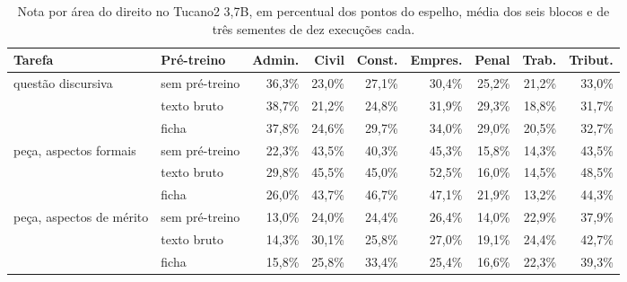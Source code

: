 \documentclass{IOS-Book-Article}
\begin{document}
\begin{table}[!ht]
\centering
\caption{Nota por área do direito no Tucano2 3,7B, em percentual dos pontos do espelho, média dos seis blocos e de três sementes de dez execuções cada.}
\footnotesize\setlength{\tabcolsep}{3pt}
\begin{tabular}{llrrrrrrr}
\hline
\textbf{Tarefa} & \textbf{Pré-treino} & \textbf{Admin.} & \textbf{Civil} & \textbf{Const.} & \textbf{Empres.} & \textbf{Penal} & \textbf{Trab.} & \textbf{Tribut.} \\
\hline
\multirow{3}{*}{questão discursiva} & sem pré-treino & 36,3\% & 23,0\% & 27,1\% & 30,4\% & 25,2\% & 21,2\% & 33,0\% \\
 & texto bruto & 38,7\% & 21,2\% & 24,8\% & 31,9\% & 29,3\% & 18,8\% & 31,7\% \\
 & ficha & 37,8\% & 24,6\% & 29,7\% & 34,0\% & 29,0\% & 20,5\% & 32,7\% \\
\multirow{3}{*}{peça, aspectos formais} & sem pré-treino & 22,3\% & 43,5\% & 40,3\% & 45,3\% & 15,8\% & 14,3\% & 43,5\% \\
 & texto bruto & 29,8\% & 45,5\% & 45,0\% & 52,5\% & 16,0\% & 14,5\% & 48,5\% \\
 & ficha & 26,0\% & 43,7\% & 46,7\% & 47,1\% & 21,9\% & 13,2\% & 44,3\% \\
\multirow{3}{*}{peça, aspectos de mérito} & sem pré-treino & 13,0\% & 24,0\% & 24,4\% & 26,4\% & 14,0\% & 22,9\% & 37,9\% \\
 & texto bruto & 14,3\% & 30,1\% & 25,8\% & 27,0\% & 19,1\% & 24,4\% & 42,7\% \\
 & ficha & 15,8\% & 25,8\% & 33,4\% & 25,4\% & 16,6\% & 22,3\% & 39,3\% \\
\hline
\end{tabular}
\end{table}
\end{document}
